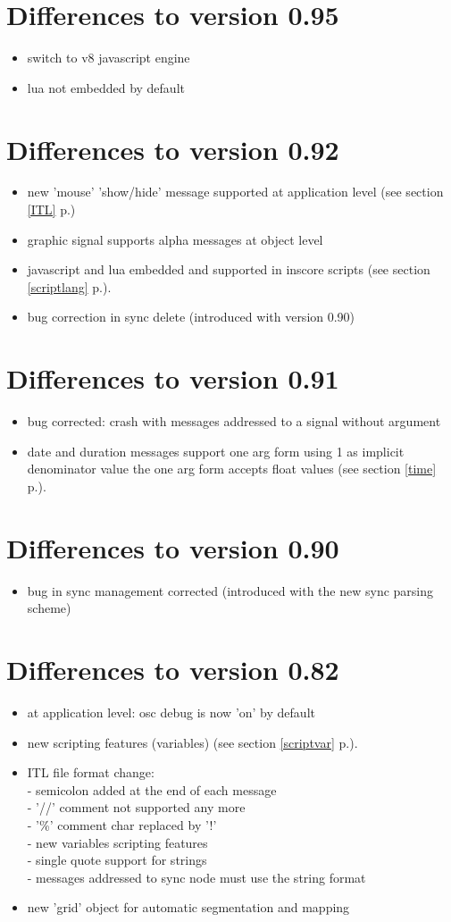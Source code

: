 \documentclass[a4paper,twoside]{report}
\newcommand{\sublevel}[1]	{\section{#1}}
\newcommand{\fullref}[1]	{\ref{#1} p.\pageref{#1}}
\begin{document}
\sublevel{Differences to version 0.95}
\begin{itemize}
\item switch to v8 javascript engine
\item lua not embedded by default
\end{itemize}

\sublevel{Differences to version 0.92}
\begin{itemize}
\item new 'mouse' 'show/hide' message supported at application level (see section \fullref{ITL})
\item graphic signal supports alpha messages at object level
\item javascript and lua embedded and supported in inscore scripts  (see section \fullref{scriptlang}).
\item bug correction in sync delete (introduced with version 0.90)
\end{itemize}

\sublevel{Differences to version 0.91}
\begin{itemize}
\item bug corrected: crash with messages addressed to a signal without argument
\item date and duration messages support one arg form using 1 as implicit denominator value 
  the one arg form accepts float values  (see section \fullref{time}).
\end{itemize}

\sublevel{Differences to version 0.90}
\begin{itemize}
\item bug in sync management corrected (introduced with the new sync parsing scheme)
\end{itemize}

\sublevel{Differences to version 0.82}
\begin{itemize}
\item at application level: osc debug is now 'on' by default
\item new scripting features (variables)  (see section \fullref{scriptvar}).
\item ITL file format change: \\
  - semicolon added at the end of each message \\
  - '//' comment not supported any more \\
  - '\%' comment char replaced by '!' \\
  - new variables scripting features \\
  - single quote support for strings \\
  - messages addressed to sync node must use the string format
\item new 'grid' object for automatic segmentation and mapping
\end{itemize}
\end{document}
